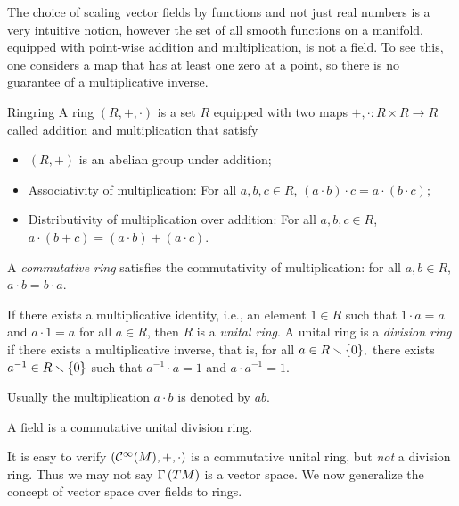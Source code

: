 The choice of scaling vector fields by functions and not just real numbers is a very intuitive notion, however the set of all smooth functions on a manifold, equipped with point-wise addition and multiplication, is not a field. To see this, one considers a map that has at least one zero at a point, so there is no guarantee of a multiplicative inverse.

\begin{definition}{Ring}{ring}
    A ring \((R, +, \cdot)\) is a set \(R\) equipped with two maps \(+, \cdot : R \times R \to R\) called addition and multiplication that satisfy
    \begin{itemize}
        \item \((R, +)\) is an abelian group under addition;
        \item Associativity of multiplication: For all \(a,b,c \in R\), \((a\cdot b)\cdot c = a \cdot(b \cdot c);\)
        \item Distributivity of multiplication over addition: For all \(a, b, c \in R\), \(a \cdot (b + c) = (a \cdot b) + (a\cdot c)\).
    \end{itemize}

    A \emph{commutative ring} satisfies the commutativity of multiplication: for all \(a,b \in R\), \(a\cdot b = b \cdot a\).

    If there exists a multiplicative identity, i.e., an element \(1 \in R\) such that \(1 \cdot a = a\) and \(a \cdot 1 = a\) for all \(a \in R\), then \(R\) is a \emph{unital ring}. A unital ring is a \emph{division ring} if there exists a multiplicative inverse, that is, for all \(a \in R\smallsetminus{\{0\}},\) there exists \(a^{-1} \in R\smallsetminus{\{0\}}\) such that \(a^{-1}\cdot a = 1\) and \(a\cdot a^{-1}=1\).

    Usually the multiplication \(a \cdot b\) is denoted by \(ab\).
\end{definition}
\begin{remark}
    A field is a commutative unital division ring.
\end{remark}

It is easy to verify \((\mathcal{C}^\infty(M), + , \cdot)\) is a commutative unital ring, but \emph{not} a division ring. Thus we may not say \(\Gamma\left(TM\right)\) is a vector space. We now generalize the concept of vector space over fields to rings.

